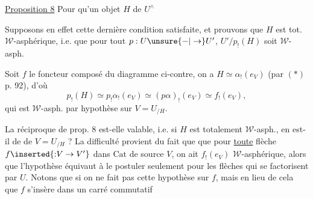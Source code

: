 \uline{Proposition 8} Pour qu'un objet $H$ de $U^\wedge$



Supposons en effet cette dernière condition satisfaite, et prouvons que $H$ est tot. $\mathcal W$-asphérique, i.e. que pour tout $p:U\unsure{-|\to}U'$, $U'/p_!(H)$ soit $\mathcal W$-asph.


Soit $f$ le foncteur composé du diagramme ci-contre, on a $H\simeq\alpha_!(e_V)$  (par $(*)$ p. 92), d'où
\[
p_!(H)\simeq p_!\alpha_!(e_V)\simeq(p\alpha)_!(e_V)\simeq f_!(e_V),
\]
qui est $\mathcal W$-asph. par hypothèse sur $V=U_{/H}$.

La réciproque de prop. 8 est-elle valable, i.e. si $H$ est totalement $\mathcal W$-asph., en est-il de  de $V=U_{/H}$ ? La difficulté provient du fait que    que pour \uline{toute} flèche $f\inserted{{:}V\to V'}$ dans $\mathrm{Cat}$ de source $V$, on ait $f_!(e_V)$ $\mathcal W$-asphérique, alors que l'hypothèse  équivaut à le postuler seulement pour les flèches qui se factorisent par $U$. Notons que si on ne fait pas cette hypothèse sur $f$, mais  en lieu de cela que $f$ s'insère dans un carré commutatif


